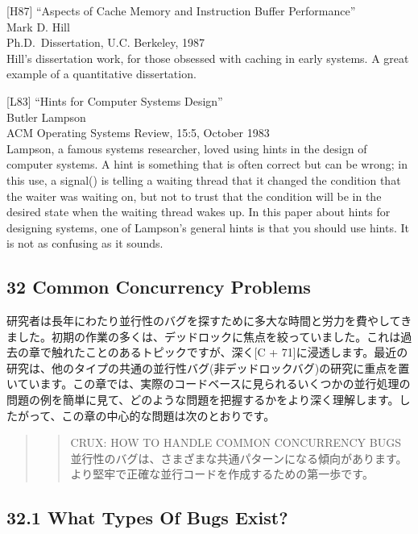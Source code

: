 {[}H87{]} ``Aspects of Cache Memory and Instruction Buffer
Performance''\\
Mark D. Hill\\
Ph.D.~Dissertation, U.C. Berkeley, 1987\\
Hill's dissertation work, for those obsessed with caching in early
systems. A great example of a quantitative dissertation.

{[}L83{]} ``Hints for Computer Systems Design''\\
Butler Lampson\\
ACM Operating Systems Review, 15:5, October 1983\\
Lampson, a famous systems researcher, loved using hints in the design of
computer systems. A hint is something that is often correct but can be
wrong; in this use, a signal() is telling a waiting thread that it
changed the condition that the waiter was waiting on, but not to trust
that the condition will be in the desired state when the waiting thread
wakes up. In this paper about hints for designing systems, one of
Lampson's general hints is that you should use hints. It is not as
confusing as it sounds.

\hypertarget{common-concurrency-problems}{%
\subsection*{32 Common Concurrency
Problems}\label{common-concurrency-problems}}

研究者は長年にわたり並行性のバグを探すために多大な時間と労力を費やしてきました。初期の作業の多くは、デッドロックに焦点を絞っていました。これは過去の章で触れたことのあるトピックですが、深く{[}C
+
71{]}に浸透します。最近の研究は、他のタイプの共通の並行性バグ(非デッドロックバグ)の研究に重点を置いています。この章では、実際のコードベースに見られるいくつかの並行処理の問題の例を簡単に見て、どのような問題を把握するかをより深く理解します。したがって、この章の中心的な問題は次のとおりです。

\begin{quote}
\begin{quote}
CRUX: HOW TO HANDLE COMMON CONCURRENCY BUGS\\
並行性のバグは、さまざまな共通パターンになる傾向があります。より堅牢で正確な並行コードを作成するための第一歩です。
\end{quote}
\end{quote}

\hypertarget{what-types-of-bugs-exist}{%
\subsection*{32.1 What Types Of Bugs
Exist?}\label{what-types-of-bugs-exist}}

